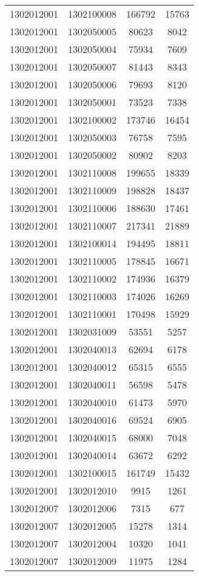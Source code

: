 \begin{longtable}[h]{llcc}
		1302012001 & 1302100008 & 166792 & 15763\\
		1302012001 & 1302050005 & 80623 & 8042\\
		1302012001 & 1302050004 & 75934 & 7609\\
		1302012001 & 1302050007 & 81443 & 8343\\
		1302012001 & 1302050006 & 79693 & 8120\\
		1302012001 & 1302050001 & 73523 & 7338\\
		1302012001 & 1302100002 & 173746 & 16454\\
		1302012001 & 1302050003 & 76758 & 7595\\
		1302012001 & 1302050002 & 80902 & 8203\\
		1302012001 & 1302110008 & 199655 & 18339\\
		1302012001 & 1302110009 & 198828 & 18437\\
		1302012001 & 1302110006 & 188630 & 17461\\
		1302012001 & 1302110007 & 217341 & 21889\\
		1302012001 & 1302100014 & 194495 & 18811\\
		1302012001 & 1302110005 & 178845 & 16671\\
		1302012001 & 1302110002 & 174936 & 16379\\
		1302012001 & 1302110003 & 174026 & 16269\\
		1302012001 & 1302110001 & 170498 & 15929\\
		1302012001 & 1302031009 & 53551 & 5257\\
		1302012001 & 1302040013 & 62694 & 6178\\
		1302012001 & 1302040012 & 65315 & 6555\\
		1302012001 & 1302040011 & 56598 & 5478\\
		1302012001 & 1302040010 & 61473 & 5970\\
		1302012001 & 1302040016 & 69524 & 6905\\
		1302012001 & 1302040015 & 68000 & 7048\\
		1302012001 & 1302040014 & 63672 & 6292\\
		1302012001 & 1302100015 & 161749 & 15432\\
		1302012001 & 1302012010 & 9915 & 1261\\
		1302012007 & 1302012006 & 7315 & 677\\
		1302012007 & 1302012005 & 15278 & 1314\\
		1302012007 & 1302012004 & 10320 & 1041\\
		1302012007 & 1302012009 & 11975 & 1284\\

\end{longtable}
